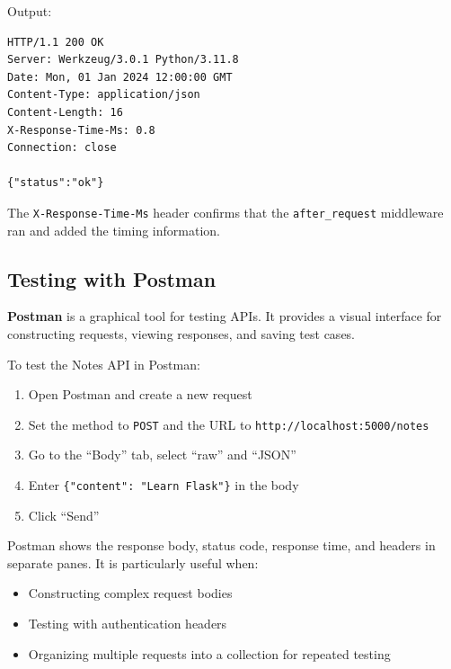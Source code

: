 \noindent{}Output:

\begin{outputbox}[short]
\begin{Verbatim}[fontsize=\codesize, breaklines, breakanywhere, breaksymbolleft={\tiny\textcolor{muted}{$\hookrightarrow$}}]
HTTP/1.1 200 OK
Server: Werkzeug/3.0.1 Python/3.11.8
Date: Mon, 01 Jan 2024 12:00:00 GMT
Content-Type: application/json
Content-Length: 16
X-Response-Time-Ms: 0.8
Connection: close

{"status":"ok"}
\end{Verbatim}
\end{outputbox}

\noindent{}The \texttt{X-Response-Time-Ms} header confirms that the \texttt{after\_request} middleware ran and added the timing information.

\subsection*{Testing with Postman}\label{04-request-handling-paths:testing-with-postman}

\textbf{Postman} is a graphical tool for testing APIs. It provides a visual interface for constructing requests, viewing responses, and saving test cases.

To test the Notes API in Postman:

\begin{enumerate}
\def\labelenumi{\arabic{enumi}.}
\tightlist
\item
  Open Postman and create a new request
\item
  Set the method to \texttt{POST} and the URL to \texttt{http:}\allowbreak{}\texttt{/}\allowbreak{}\texttt{/}\allowbreak{}\texttt{localhost:}\allowbreak{}\texttt{5000/}\allowbreak{}\texttt{notes}
\item
  Go to the ``Body'' tab, select ``raw'' and ``JSON''
\item
  Enter \texttt{\{"content":}\allowbreak{}\texttt{\ "Learn\ Flask"\}} in the body
\item
  Click ``Send''
\end{enumerate}

\noindent{}Postman shows the response body, status code, response time, and headers in separate panes. It is particularly useful when:

\begin{itemize}
\tightlist
\item
  Constructing complex request bodies
\item
  Testing with authentication headers
\item
  Organizing multiple requests into a collection for repeated testing
\end{itemize}

